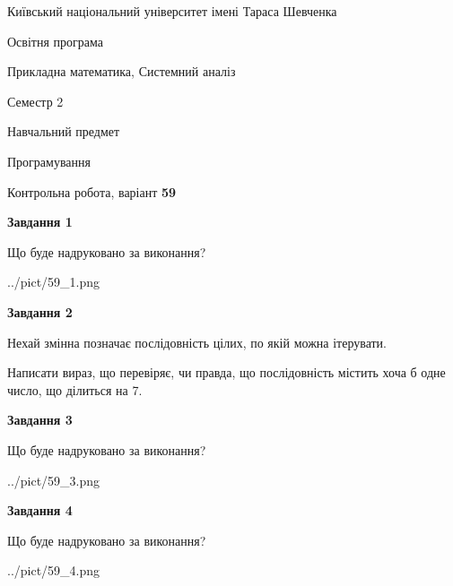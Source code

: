 \documentclass[12pt, ukrainian]{article}
\begin{document}
{{\begin {small}\par
{ \center  Київський національний університет імені Тараса Шевченка \par}
{\parbox {5 cm}{Освітня програма \hfill}{\parbox {8 cm}{Прикладна математика, Системний аналіз \hfill}}\parbox {5 cm}{\hfill Семестр 2}}\par
{\parbox {5 cm} {Навчальний предмет \hfill}\parbox {7 cm}{Програмування \hfill}\parbox {6cm}{\hfill}\par}\vspace{-7pt} \end{small}}{\center Контрольна робота, варіант  \No \textbf
{ 59 }\par}}
{
\begin {large}
{\begin {center}\textbf{Завдання 1}\end {center}}\par
Що буде надруковано за виконання?\par\par
\begin{center}
	{../pict/59_1.png}
\end{center}
\newpage

{\begin {center}\textbf{Завдання 2}\end {center}}\par
Нехай змінна  позначає послідовність цілих, по якій можна ітерувати.

Написати вираз, що перевіряє, чи правда, що послідовність  містить хоча б одне число, що ділиться на 7.\par
\newpage

{\begin {center}\textbf{Завдання 3}\end {center}}\par
Що буде надруковано за виконання?\par
\begin{center}
	{../pict/59_3.png}
\end{center}
\newpage

{\begin {center}\textbf{Завдання 4}\end {center}}\par
Що буде надруковано за виконання?\par
\begin{center}
	{../pict/59_4.png}
\end{center}
\newpage


\end{large}}
\end{document}
